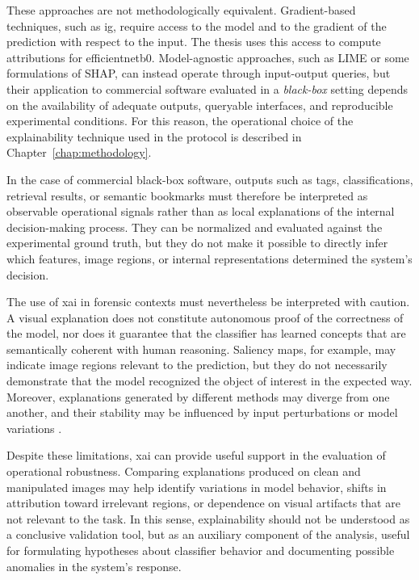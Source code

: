 These approaches are not methodologically equivalent. Gradient-based
techniques, such as \gls{ig}, require access to the model and to the gradient of
the prediction with respect to the input. The thesis uses this access to compute
attributions for \gls{efficientnetb0}. Model-agnostic
approaches, such as LIME or some formulations of SHAP, can instead operate
through input-output queries, but their application to commercial software
evaluated in a \textit{black-box} setting depends on the availability of
adequate outputs, queryable interfaces, and reproducible experimental
conditions. For this reason, the operational choice of the explainability
technique used in the protocol is described in Chapter~\ref{chap:methodology}.

In the case of commercial black-box software, outputs such as tags,
classifications, retrieval results, or semantic bookmarks must therefore be
interpreted as observable operational signals rather than as local explanations
of the internal decision-making process. They can be normalized and evaluated
against the experimental ground truth, but they do not make it possible to
directly infer which features, image regions, or internal representations
determined the system's decision.

The use of \gls{xai} in forensic contexts must nevertheless be interpreted with
caution. A visual explanation does not constitute autonomous proof of the
correctness of the model, nor does it guarantee that the classifier has learned
concepts that are semantically coherent with human reasoning. Saliency maps,
for example, may indicate image regions relevant to the prediction, but they do
not necessarily demonstrate that the model recognized the object of interest in
the expected way. Moreover, explanations generated by different methods may
diverge from one another, and their stability may be influenced by input
perturbations or model variations \cite{Adadi2018,Carvalho2019}.

Despite these limitations, \gls{xai} can provide useful support in the
evaluation of operational robustness. Comparing explanations produced on clean
and manipulated images may help identify variations in model behavior, shifts
in attribution toward irrelevant regions, or dependence on visual artifacts
that are not relevant to the task. In this sense, explainability should not be
understood as a conclusive validation tool, but as an auxiliary component of
the analysis, useful for formulating hypotheses about classifier behavior and
documenting possible anomalies in the system's response.


